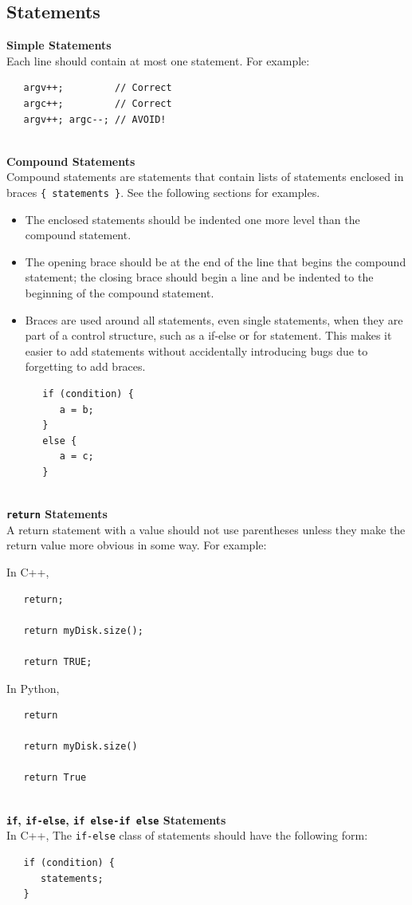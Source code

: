 \documentclass{CSSRforAfrica}
\newcommand{\blank}{~\\}
\begin{document}
\begin{appendices}
\subsection{Statements}
{\bf Simple Statements}\\
Each line should contain at most one statement. For example:
{\small
\begin{verbatim}
   argv++;         // Correct
   argc++;         // Correct
   argv++; argc--; // AVOID!
\end{verbatim}
}
\blank
{\bf Compound Statements}\\
Compound statements are statements that contain lists of statements enclosed in braces
{\small \verb+{ statements }+}. See the following sections for examples.
\begin{itemize}
\item The enclosed statements should be indented one more level than the compound statement.
\item The opening brace should be at the end of the line that begins the compound statement; the
closing brace should begin a line and be indented to the beginning of the compound
statement.
\item Braces are used around all statements, even single statements, when they are part of a
control structure, such as a if-else or for statement. This makes it easier to add
statements without accidentally introducing bugs due to forgetting to add braces.
{\small
\begin{verbatim}
   if (condition) {
      a = b;
   }
   else {
      a = c;
   }
\end{verbatim}
}
\end{itemize}
\blank
{\bf { \verb+return+} Statements}\\
A return statement with a value should not use parentheses unless they make the return value
more obvious in some way. For example:

\noindent
In C++, 
{\small
\begin{verbatim}
   return;

   return myDisk.size();

   return TRUE;
\end{verbatim}
}

\noindent
In Python, 
{\small
\begin{verbatim}
   return

   return myDisk.size()

   return True
\end{verbatim}
}
\blank
{\bf { \tt if}, {\small \tt if-else}, {\small \tt if else-if else} Statements}\\
In C++,
The {\small \verb+if-else+} class of statements should have the following form:
{\small
\begin{verbatim}
   if (condition) {
      statements;
   }


\end{verbatim}}
\end{appendices}
\end{document}
